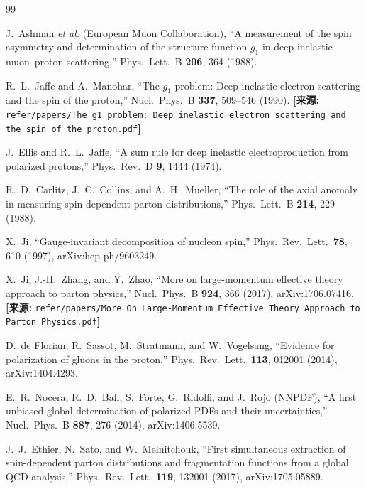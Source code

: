 \documentclass[12pt,a4paper]{ctexart}
\theoremstyle{definition}
\begin{document}
\begin{thebibliography}{99}


J.~Ashman \textit{et al.} (European Muon Collaboration),
``A measurement of the spin asymmetry and determination of the structure function $g_1$ in deep inelastic muon--proton scattering,''
Phys.\ Lett.\ B \textbf{206}, 364 (1988).

R.~L.~Jaffe and A.~Manohar,
``The $g_1$ problem: Deep inelastic electron scattering and the spin of the proton,''
Nucl.\ Phys.\ B \textbf{337}, 509--546 (1990).
\quad\textbf{[来源:} \texttt{refer/papers/The g1 problem: Deep inelastic electron scattering and the spin of the proton.pdf}\textbf{]}

J.~Ellis and R.~L.~Jaffe,
``A sum rule for deep inelastic electroproduction from polarized protons,''
Phys.\ Rev.\ D \textbf{9}, 1444 (1974).

R.~D.~Carlitz, J.~C.~Collins, and A.~H.~Mueller,
``The role of the axial anomaly in measuring spin-dependent parton distributions,''
Phys.\ Lett.\ B \textbf{214}, 229 (1988).


X.~Ji,
``Gauge-invariant decomposition of nucleon spin,''
Phys.\ Rev.\ Lett.\ \textbf{78}, 610 (1997), arXiv:hep-ph/9603249.

X.~Ji, J.-H.~Zhang, and Y.~Zhao,
``More on large-momentum effective theory approach to parton physics,''
Nucl.\ Phys.\ B \textbf{924}, 366 (2017), arXiv:1706.07416.
\quad\textbf{[来源:} \texttt{refer/papers/More On Large-Momentum Effective Theory Approach to Parton Physics.pdf}\textbf{]}


D.~de Florian, R.~Sassot, M.~Stratmann, and W.~Vogelsang,
``Evidence for polarization of gluons in the proton,''
Phys.\ Rev.\ Lett.\ \textbf{113}, 012001 (2014), arXiv:1404.4293.

E.~R.~Nocera, R.~D.~Ball, S.~Forte, G.~Ridolfi, and J.~Rojo (NNPDF),
``A first unbiased global determination of polarized PDFs and their uncertainties,''
Nucl.\ Phys.\ B \textbf{887}, 276 (2014), arXiv:1406.5539.

J.~J.~Ethier, N.~Sato, and W.~Melnitchouk,
``First simultaneous extraction of spin-dependent parton distributions and fragmentation functions from a global QCD analysis,''
Phys.\ Rev.\ Lett.\ \textbf{119}, 132001 (2017), arXiv:1705.05889.


\end{thebibliography}
\end{document}
